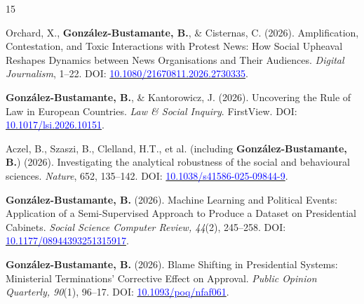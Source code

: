 \begin{publications}

\begin{benumerate}{15}

\item{Orchard, X., {\bfseries González-Bustamante, B.}, \& Cisternas, C. (2026). Amplification, Contestation, and Toxic Interactions with Protest News: How Social Upheaval Reshapes Dynamics between News Organisations and Their Audiences. {\itshape Digital Journalism}, 1--22. DOI: \href{https://doi.org/10.1080/21670811.2026.2730335}{\textcolor{blue}{10.1080/21670811.2026.2730335}}.}\vspace{1mm}

\item{{\bfseries González-Bustamante, B.}, \& Kantorowicz, J. (2026). Uncovering the Rule of Law in European Countries. {\itshape Law \& Social Inquiry}. FirstView. DOI: \href{https://doi.org/10.1017/lsi.2026.10151}{\textcolor{blue}{10.1017/lsi.2026.10151}}.}\vspace{1mm}

\item{Aczel, B., Szaszi, B., Clelland, H.T., et al. (including {\bfseries González-Bustamante, B.}) (2026). Investigating the analytical robustness of the social and behavioural sciences. {\itshape Nature}, 652, 135--142. DOI: \href{https://doi.org/10.1038/s41586-025-09844-9}{\textcolor{blue}{10.1038/s41586-025-09844-9}}.}\vspace{1mm}

\item{{\bfseries González-Bustamante, B.} (2026). Machine Learning and Political Events: Application of a Semi-Supervised Approach to Produce a Dataset on Presidential Cabinets. {\itshape Social Science Computer Review, 44}(2), 245--258. DOI: \href{https://doi.org/10.1177/08944393251315917}{\textcolor{blue}{10.1177/08944393251315917}}.}\vspace{1mm} %

\item{{\bfseries González-Bustamante, B.} (2026). Blame Shifting in Presidential Systems: Ministerial Terminations’ Corrective Effect on Approval. {\itshape Public Opinion Quarterly, 90}(1), 96--17. DOI: \href{https://doi.org/10.1093/poq/nfaf061}{\textcolor{blue}{10.1093/poq/nfaf061}}.}\vspace{1mm}


\end{benumerate}
\end{publications}
